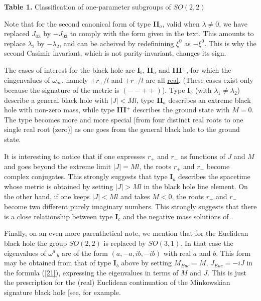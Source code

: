 \documentclass[12pt]{article}
\newcounter{c1} \newcounter{c2}
\begin{document}
\centerline{{\bf Table 1.} Classification of one-parameter subgroups of
 $SO(2,2)$}
\vspace{7mm}

Note that for the second canonical form of type {\bf II}$_a$, valid when
 $\lambda \not= 0$, we have replaced $J_{03}$ by $-J_{03}$ to comply with the
 form given in the text. This amounts to replace $\lambda_2$ by $-\lambda_2$,
 and can be acheived by redefinining $\xi^0$ as $-\xi^0$. This is why the
second Casimir invariant, which is not parity-invariant, changes its sign.


The cases of interest for the black hole are {\bf
I}$_b$, {\bf II}$_a$ and {\bf III}$^+$, for which the
eingenvalues of $\omega_{ab}$, namely $\pm r_{+}/l$ and $\pm r_{-}/l$  are all
 \underline{real}. (These cases exist only because
the signature of the metric is $(--++)$). Type {\bf I}$_b$ (with
$\lambda_1\neq \lambda_2$) describe a general black hole with
$|J|<Ml$, type {\bf II}$_a$ describes an extreme black hole with
non-zero mass, while type {\bf III}$^+$ describes the ground
state with $M=0$. The type becomes more and more special [from four
distinct real roots to one single real root (zero)] as one goes
from the general black hole to the ground state.

It is interesting to notice that if one expresses $r_+$ and
$r_-$ as functions of $J$ and $M$ and goes beyond the extreme
limit $|J|=Ml$, the roots $r_+$ and $r_-$ become complex
conjugates. This strongly suggests that type {\bf I}$_a$
describes the spacetime whose metric is obtained by setting
$|J|>Ml$ in the black hole line element. On the other hand, if
one keeps $|J|<Ml$ and takes $M<0$, the roots $r_+$ and $r_-$
become two different purely imaginary numbers. This strongly
suggests that there is a close relationship between type {\bf
I}$_c$ and the negative mass solutions of \cite{5}.

Finally, on an even more parenthetical note, we mention that for
the Euclidean black hole the group $SO(2,2)$ is replaced by
$SO(3,1)$. In that case the eigenvalues of $\omega^a\,_b$ are of
the form $(a, -a, ib, -ib)$ with real $a$ and $b$. This form may
be obtained from that of type {\bf I}$_b$ above by setting
$M_{Euc}=M$, $J_{Euc}=-iJ$ in the formula (\ref{21}), expressing
the eigenvalues in terms of $M$ and $J$. This is just the
prescription for the (real) Euclidean continuation of the
Minkowskian signature black hole [see, for example\cite{1}.

\vspace{1cm}
\end{document}
